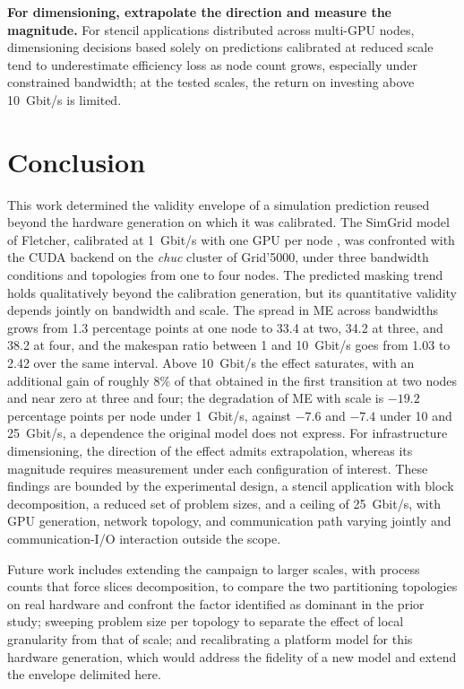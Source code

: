 \documentclass[12pt]{article}
\begin{document}
\textbf{For dimensioning, extrapolate the direction and measure the magnitude.} For stencil applications distributed across multi-GPU nodes, dimensioning decisions based solely on predictions calibrated at reduced scale tend to underestimate efficiency loss as node count grows, especially under constrained bandwidth; at the tested scales, the return on investing above 10~Gbit/s is limited.

\section{Conclusion}

This work determined the validity envelope of a simulation prediction reused beyond the hardware generation on which it was calibrated. The SimGrid model of Fletcher, calibrated at 1~Gbit/s with one GPU per node \cite{spadotto2026carla}, was confronted with the CUDA backend on the \textit{chuc} cluster of Grid'5000, under three bandwidth conditions and topologies from one to four nodes. The predicted masking trend holds qualitatively beyond the calibration generation, but its quantitative validity depends jointly on bandwidth and scale. The spread in ME across bandwidths grows from 1.3 percentage points at one node to 33.4 at two, 34.2 at three, and 38.2 at four, and the makespan ratio between 1 and 10~Gbit/s goes from 1.03 to 2.42 over the same interval. Above 10~Gbit/s the effect saturates, with an additional gain of roughly 8\% of that obtained in the first transition at two nodes and near zero at three and four; the degradation of ME with scale is $-19.2$ percentage points per node under 1~Gbit/s, against $-7.6$ and $-7.4$ under 10 and 25~Gbit/s, a dependence the original model does not express. For infrastructure dimensioning, the direction of the effect admits extrapolation, whereas its magnitude requires measurement under each configuration of interest. These findings are bounded by the experimental design, a stencil application with block decomposition, a reduced set of problem sizes, and a ceiling of 25~Gbit/s, with GPU generation, network topology, and communication path varying jointly and communication-I/O interaction outside the scope.

Future work includes extending the campaign to larger scales, with process counts that force slices decomposition, to compare the two partitioning topologies on real hardware and confront the factor identified as dominant in the prior study; sweeping problem size per topology to separate the effect of local granularity from that of scale; and recalibrating a platform model for this hardware generation, which would address the fidelity of a new model and extend the envelope delimited here.
\end{document}
